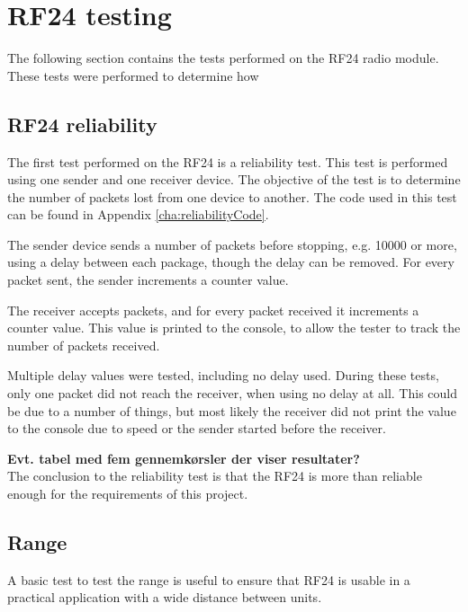 \section{RF24 testing}
The following section contains the tests performed on the RF24 radio module. These tests were performed to determine how 

\subsection{RF24 reliability}
The first test performed on the RF24 is a reliability test. This test is performed using one sender and one receiver device. The objective of the test is to determine the number of packets lost from one device to another. 
The code used in this test can be found in Appendix \ref{cha:reliabilityCode}.


The sender device sends a number of packets before stopping, e.g. 10000 or more, using a delay between each package, though the delay can be removed. For every packet sent, the sender increments a counter value.

The receiver accepts packets, and for every packet received it increments a counter value. This value is printed to the console, to allow the tester to track the number of packets received.

Multiple delay values were tested, including no delay used. During these tests, only one packet did not reach the receiver, when using no delay at all. This could be due to a number of things, but most likely the receiver did not print the value to the console due to speed or the sender started before the receiver.

\textbf{Evt. tabel med fem gennemkørsler der viser resultater?} \\

The conclusion to the reliability test is that the RF24 is more than reliable enough for the requirements of this project.



\subsection{Range}
A basic test to test the range is useful to ensure that RF24 is usable in a practical application with a wide distance between units.

